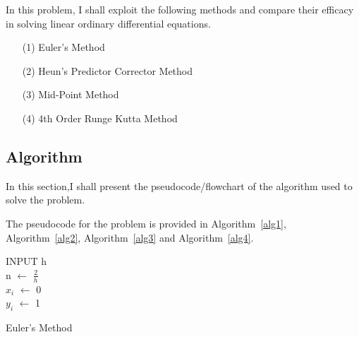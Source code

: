 \documentclass[titlepage, 11pt]{article}
\begin{document}
In this problem, I shall exploit the following methods and compare their efficacy in solving linear ordinary differential equations. 
\begin{itemize}
    \item [(1)] Euler's Method 
    \item [(2)] Heun's Predictor Corrector Method
    \item [(3)] Mid-Point Method
    \item [(4)] 4th Order Runge Kutta Method
\end{itemize}


\subsection{Algorithm}
In this section,I shall present the pseudocode/flowchart of the algorithm used to solve the problem.

The pseudocode for the problem is provided in Algorithm~\ref{alg1}, Algorithm~\ref{alg2}, Algorithm~\ref{alg3} and Algorithm~\ref{alg4}.
\begin{center}
\begin{algorithm}[H]\label{alg1}

\SetAlgoLined

INPUT h \\
n $\gets$ $\frac{2}{h}$ \\
$x_i$ $\gets$ 0\\
$y_i$ $\gets$ 1\\

 \caption{Euler's Method}
\end{algorithm}    
\end{center}
\end{document}
